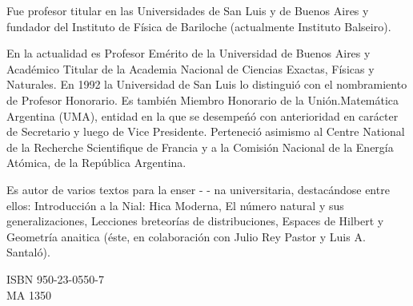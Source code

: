 \documentclass[10pt]{article}
\theoremstyle{plain}
\theoremstyle{definition}
\theoremstyle{remark}
\begin{document}
Fue profesor titular en las Universidades de San Luis y de Buenos Aires y fundador del Instituto de Física de Bariloche (actualmente Instituto Balseiro).

En la actualidad es Profesor Emérito de la Universidad de Buenos Aires y Académico Titular de la Academia Nacional de Ciencias Exactas, Físicas y Naturales. En 1992 la Universidad de San Luis lo distinguió con el nombramiento de Profesor Honorario. Es también Miembro Honorario de la Unión.Matemática Argentina (UMA), entidad en la que se desempeńó con anterioridad en carácter de Secretario y luego de Vice Presidente. Perteneció asimismo al Centre National de la Recherche Scientifique de Francia y a la Comisión Nacional de la Energía Atómica, de la República Argentina.

Es autor de varios textos para la enser - - na universitaria, destacándose entre ellos: Introducción a la Nial: Hica Moderna, El número natural y sus generalizaciones, Lecciones breteorías de distribuciones, Espaces de Hilbert y Geometría anaitica (éste, en colaboración con Julio Rey Pastor y Luis A. Santaló).

ISBN 950-23-0550-7\\
MA 1350
\end{document}
